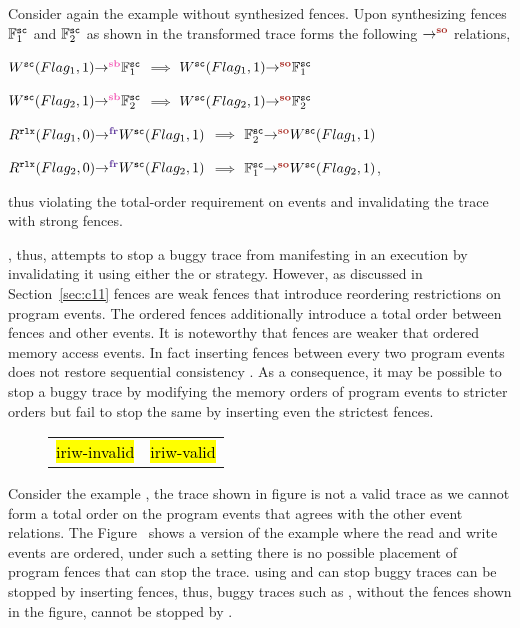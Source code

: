 Consider again the example  without synthesized fences.
Upon synthesizing \sc fences $\mathbb{F}^\sc_1$ and 
$\mathbb{F}^\sc_2$ as shown in  the
transformed trace forms the following $\so{}{}{}$ relations,

$\seqb{}{W^\sc(Flag_1,1)}{\mathbb{F}^\sc_1}$ $\implies$ $\so{}{W^\sc(Flag_1,1)}{\mathbb{F}^\sc_1}$

$\seqb{}{W^\sc(Flag_2,1)}{\mathbb{F}^\sc_2}$ $\implies$ $\so{}{W^\sc(Flag_2,1)}{\mathbb{F}^\sc_2}$

$\fr{}{R^\rlx(Flag_1,0)}{W^\sc(Flag_1,1)}$ $\implies$ $\so{}{\mathbb{F}^\sc_2}{W^\sc(Flag_1,1)}$

$\fr{}{R^\rlx(Flag_2,0)}{W^\sc(Flag_2,1)}$ $\implies$ $\so{}{\mathbb{F}^\sc_1}{W^\sc(Flag_2,1)}$,

thus violating the total-order requirement on \sc events and
invalidating the trace with strong fences.

\ourtechnique, thus, attempts to stop a buggy trace from
manifesting in an execution by invalidating it using either 
the \wkfence or \stfence strategy.
%
However, 
as discussed in Section~\ref{sec:c11} \cc fences are weak
fences that introduce reordering restrictions on program
events. The \sc ordered fences additionally introduce a 
total order between \sc fences and other \sc events. 
%
It is noteworthy that \cc \sc fences are weaker that \sc
ordered memory access events. In fact inserting \sc 
fences between every two program events does not restore
sequential consistency \cite{LahavVafeiadis-PLDI17}.
%
As a consequence, it may be possible to stop a buggy 
trace by modifying the memory orders of program events
to stricter orders but fail to stop the same by 
inserting even the strictest \cc fences.

\begin{figure}[h]
	\begin{tabular}{|c|c|}
		\hline
		\resizebox{0.49\textwidth}{!}{} &
		\resizebox{0.49\textwidth}{!}{} \\
		\hline
		\multicolumn{1}{c}{\hl{iriw-invalid}} & 
		\multicolumn{1}{c}{\hl{iriw-valid}}
	\end{tabular}
\end{figure}
Consider the example , the trace shown in
figure is not a valid \cc trace as we cannot form a total 
order on the \sc program events that agrees with the other event
relations. The Figure~ shows a version 
of the example where the read and write events are \rlx ordered,
under such a setting there is no possible placement of 
program fences that can stop the trace.
%
\ourtechnique using \wkfence and \stfence can stop buggy
traces can be stopped by inserting \cc fences, thus, buggy
traces such as , without the fences shown 
in the figure, cannot be stopped by \ourtechnique.